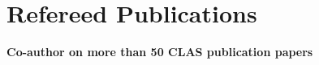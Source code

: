 \documentclass[10pt, letterpaper]{article}
\newcommand{\years}[1]{\marginnote{\small #1}} %
\newcommand{\publication}[2]{ \years{#1} \bibentry{#2}. \par\vspace{0.8mm}  }
\newcommand{\publicationNyr}[1]{ \bibentry{#1}. \par\vspace{0.8mm}  }
\begin{document}
\section*{Refereed Publications}
\noindent
\textbf{Co-author on more than 50 CLAS publication papers} 
\begin{comment}
\subsection*{2013 Publications}
\noindent

\publicationNyr{Dugger:2013crn}
\publicationNyr{Adhikari:2013ija}
\publicationNyr{Moteabbed:2013isu}
\publicationNyr{Moriya:2013hwg}
\publicationNyr{Pomerantz:2013ysu}
\publicationNyr{Tang:2013gsa}
\publicationNyr{Nepali:2013bp}
\publicationNyr{Moriya:2013eb}

\end{comment}
\end{document}
